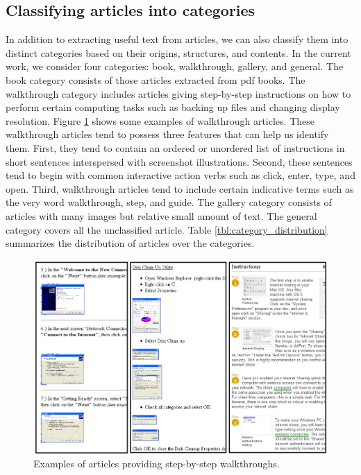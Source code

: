\documentclass{www2010-submission}
\begin{document}
\subsection{Classifying articles into categories}

In addition to extracting useful text from articles, we can also
classify them into distinct categories based on their origins,
structures, and contents.  In the current work, we consider four
categories: book, walkthrough, gallery, and general. The book category
consists of those articles extracted from pdf books. The walkthrough
category includes articles giving step-by-step instructions on how to
perform certain computing tasks such as backing up files and changing
display resolution. Figure \ref{fig:example_walkthrough} shows some
examples of walkthrough articles. These walkthrough articles tend to
possess three features that can help us identify them. First, they
tend to contain an ordered or unordered list of instructions in short
sentences interspersed with screenshot illustrations.  Second, these
sentences tend to begin with common interactive action verbs such as
click, enter, type, and open. Third, walkthrough articles tend to
include certain indicative terms such as the very word walkthrough,
step, and guide. The gallery category consists of articles with many
images but relative small amount of text. The general category covers
all the unclassified article. Table \ref{tbl:category_distribution}
summarizes the distribution of articles over the categories.

\begin{figure}
\includegraphics[width=1\columnwidth]{figure/walkthrough_examples.png}
\caption{Examples of articles providing step-by-step walkthroughs.}
\label{fig:example_walkthrough}
\end{figure}
\end{document}
